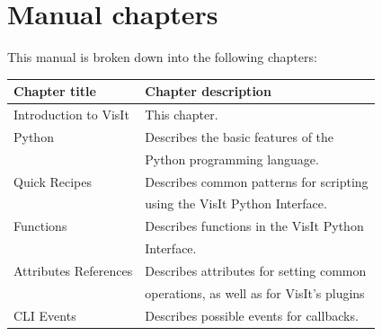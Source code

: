 \documentclass[letterpaper,10pt,english]{sphinxmanual}
\begin{document}
\section{Manual chapters}
\label{intro:manual-chapters}
This manual is broken down into the following chapters:

\begin{tabulary}{\linewidth}{|L|L|}
\hline
\textsf{\relax 
Chapter title
} & \textsf{\relax 
Chapter description
}\\
\hline
Introduction to VisIt
 & 
This chapter.
\\
\hline
Python
 & 
Describes the basic features of the
\\
\hline & 
Python programming language.
\\
\hline
Quick Recipes
 & 
Describes common patterns for scripting
\\
\hline & 
using the VisIt Python Interface.
\\
\hline
Functions
 & 
Describes functions in the VisIt Python
\\
\hline & 
Interface.
\\
\hline
Attributes References
 & 
Describes attributes for setting common
\\
\hline & 
operations, as well as for VisIt’s plugins
\\
\hline
CLI Events
 & 
Describes possible events for callbacks.
\\
\hline\end{tabulary}
\end{document}

